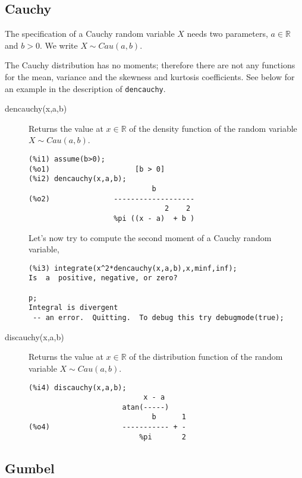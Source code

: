 \documentclass[12pt,a4paper]{article}
\newcommand{\R}{\mathbb{R}}
\begin{document}
\subsection{Cauchy}

The specification of a Cauchy random variable $X$ needs two parameters, $a \in \R$ and $b>0$. We write $X \sim Cau(a,b)$.

The Cauchy distribution has no moments; therefore there are not any functions for the mean, variance and the skewness and kurtosis coefficients. See below for an example in the description of \verb|dencauchy|. 

\begin{description}

\item[dencauchy(x,a,b)] Returns the value at $x \in \R$ of the density function of the random variable $X \sim Cau(a,b)$.

\begin{verbatim}
(%i1) assume(b>0);
(%o1)                    [b > 0]
(%i2) dencauchy(x,a,b);
                             b
(%o2)               -------------------
                                2    2
                    %pi ((x - a)  + b )
\end{verbatim}

Let's now try to compute the second moment of a Cauchy random variable,
\begin{verbatim}
(%i3) integrate(x^2*dencauchy(x,a,b),x,minf,inf);
Is  a  positive, negative, or zero?

p;
Integral is divergent
 -- an error.  Quitting.  To debug this try debugmode(true);
\end{verbatim}

\item[discauchy(x,a,b)] Returns the value at $x \in \R$ of the distribution function of the random variable $X \sim Cau(a,b)$.

\begin{verbatim}
(%i4) discauchy(x,a,b);
                           x - a
                      atan(-----)
                             b      1
(%o4)                 ----------- + -
                          %pi       2
\end{verbatim}

\end{description}


\subsection{Gumbel}
\end{document}
